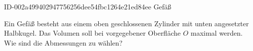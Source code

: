 \begin{exercise}
      {ID-002a499402947756256dee54fbc1264e21ed84ee}
      {Gefäß}
  \ifproblem\problem\par
    Ein Gefäß besteht aus einem oben geschlossenen Zylinder mit
    unten angesetzter Halbkugel. Das Volumen soll bei vorgegebener
    Oberfläche $O$ maximal werden. Wie sind die Abmessungen zu wählen?
  \fi
\end{exercise}
